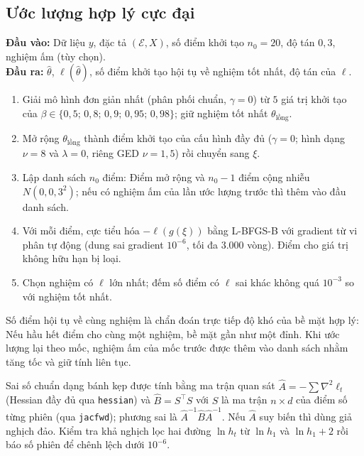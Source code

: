 \documentclass[12pt,a4paper]{article}
\newcounter{thuattoan}
\newenvironment{thuattoan}[1]{%
  \refstepcounter{thuattoan}%
  \begin{tcolorbox}[enhanced,breakable,colback=nenkhung,colframe=vienkhung,boxrule=0.5pt,arc=1mm,
    left=6pt,right=6pt,top=4pt,bottom=4pt,
    title={\textbf{Thuật toán \thethuattoan.} #1},coltitle=black,colbacktitle=nenkhung!60!vienkhung!25]%
  \small
}{\end{tcolorbox}}
\theoremstyle{remark}
\newcommand{\Ecal}{\mathcal{E}}
\newcommand{\Ncal}{N}
\newcommand{\ma}[1]{\texttt{\small #1}}
\begin{document}
\subsection{Ước lượng hợp lý cực đại}

\begin{thuattoan}{MLE nhiều điểm khởi tạo (hàm \ma{mle})}
\textbf{Đầu vào:} Dữ liệu $y$, đặc tả $(\Ecal,X)$, số điểm khởi tạo $n_0=20$, độ tán $0{,}3$, nghiệm ấm (tùy chọn).\\
\textbf{Đầu ra:} $\hat\theta$, $\ell(\hat\theta)$, số điểm khởi tạo hội tụ về nghiệm tốt nhất, độ tán của $\ell$.
\begin{enumerate}
\item Giải mô hình đơn giản nhất (phân phối chuẩn, $\gamma=0$) từ $5$ giá trị khởi tạo của $\beta\in\{0{,}5;\,0{,}8;\,0{,}9;\,0{,}95;\,0{,}98\}$; giữ nghiệm tốt nhất $\theta_{\text{lồng}}$.
\item Mở rộng $\theta_{\text{lồng}}$ thành điểm khởi tạo của cấu hình đầy đủ ($\gamma=0$; hình dạng $\nu=8$ và $\lambda=0$, riêng GED $\nu=1{,}5$) rồi chuyển sang $\xi$.
\item Lập danh sách $n_0$ điểm: Điểm mở rộng và $n_0-1$ điểm cộng nhiễu $\Ncal(0,0{,}3^2)$; nếu có nghiệm ấm của lần ước lượng trước thì thêm vào đầu danh sách.
\item Với mỗi điểm, cực tiểu hóa $-\ell(g(\xi))$ bằng L-BFGS-B với gradient từ vi phân tự động (dung sai gradient $10^{-6}$, tối đa $3.000$ vòng). Điểm cho giá trị không hữu hạn bị loại.
\item Chọn nghiệm có $\ell$ lớn nhất; đếm số điểm có $\ell$ sai khác không quá $10^{-3}$ so với nghiệm tốt nhất.
\end{enumerate}
\end{thuattoan}

Số điểm hội tụ về cùng nghiệm là chẩn đoán trực tiếp độ khó của bề mặt hợp lý: Nếu hầu hết điểm cho cùng một nghiệm, bề mặt gần như một đỉnh. Khi ước lượng lại theo mốc, nghiệm ấm của mốc trước được thêm vào danh sách nhằm tăng tốc và giữ tính liên tục.

Sai số chuẩn dạng bánh kẹp được tính bằng ma trận quan sát $\hat A=-\sum\nabla^2\ell_t$ (Hessian đầy đủ qua \ma{hessian}) và $\hat B=S^\top S$ với $S$ là ma trận $n\times d$ của điểm số từng phiên (qua \ma{jacfwd}); phương sai là $\hat A^{-1}\hat B\hat A^{-1}$. Nếu $\hat A$ suy biến thì dùng giả nghịch đảo. Kiểm tra khả nghịch lọc hai đường $\ln h_t$ từ $\ln h_1$ và $\ln h_1+2$ rồi báo số phiên để chênh lệch dưới $10^{-6}$.
\end{document}
